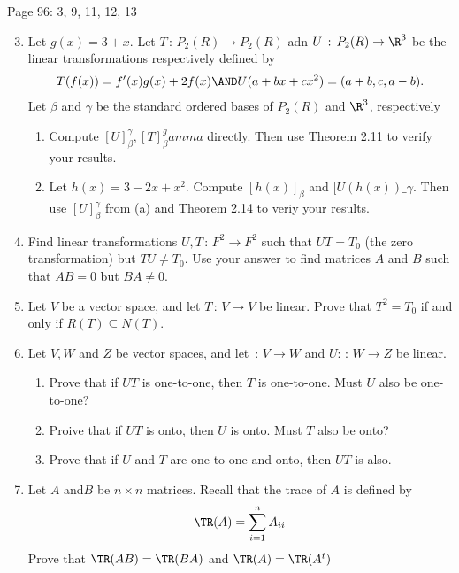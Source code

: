 \documentclass[10pt,a4paper]{report}
\begin{document}
\newpage
Page 96: 3, 9, 11, 12, 13
\begin{enumerate}
	\setcounter{enumi}{2}
	\item Let $g(x)=3+x$.  Let $T\,:\, P_2(R)\to P_2(R)$ adn $U\,:\, P_2(R) \to \R^3$ be the linear transformations respectively defined by 
	\begin{align*}
	T(f(x)) = f'(x)g(x)+2f(x)\AND U(a+bx+cx^2)=(a+b,c,a-b).
	\end{align*}Let $\beta$ and $\gamma$ be the standard ordered bases of $P_2(R)$ and $\R^3$, respectively
	\begin{enumerate}
		\item Compute $[U]_\beta^\gamma, [T]_\beta^gamma$ directly.  Then use Theorem 2.11 to verify your results.
		\item Let $h(x) =3-2x+x^2$.  Compute $[h(x)]_\beta$ and $[U(h(x))\_\gamma$.  Then use $[U]_\beta^\gamma$ from (a) and Theorem 2.14 to veriy your results.
	\end{enumerate}
	\setcounter{enumi}{8}
	\item Find linear transformations $U,T\,:\,F^2\to F^2$ such that $UT=T_0$ (the zero transformation) but $TU\ne T_0$.  Use your answer to find matrices $A$ and $B$ such that $AB=0$ but $BA \ne 0$.
	\setcounter{enumi}{10}
	\item Let $V$ be a vector space, and let $T\,:\,V\to V$ be linear.  Prove that $T^2=T_0$ if and only if $R(T)\subseteq N(T)$.
	\item Let $V,W$ and $Z$ be vector spaces, and let $\,:\, V\to W$ and $U:\,:\,W \to Z$ be linear.
	\begin{enumerate}
		\item Prove that if $UT$ is one-to-one, then $T$ is one-to-one. Must $U$ also be one-to-one?
		\item Proive that if $UT$ is onto, then $U$ is onto.  Must $T$ also be onto?
		\item Prove that if $U$ and $T$ are one-to-one and onto, then $UT$ is also.
	\end{enumerate}
	\item Let $A$ and$B$ be $n\times n$ matrices.  Recall that the trace of $A$ is defined by 
	\begin{align*}
		\TR(A) = \sum_{i=1}^n A_{ii}
	\end{align*}Prove that $\TR(AB)=\TR(BA)$ and $\TR(A)=\TR(A^t)$
\end{enumerate}
\end{document}
